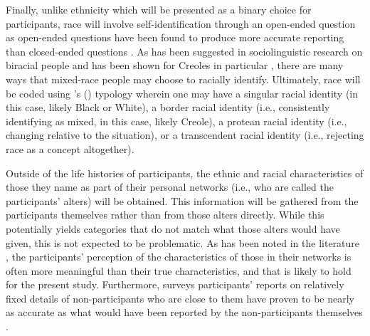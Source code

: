 \documentclass{article}\usepackage[]{graphicx}\usepackage[]{xcolor}
\begin{document}
      Finally, unlike ethnicity which will be presented as a binary choice for participants, race will involve self-identification through an open-ended question as open-ended questions have been found to produce more accurate reporting than closed-ended questions \parencite[p.~434]{vannette_proxy_2018}.
      As has been suggested in sociolinguistic research on biracial people \parencite{holliday_multiracial_2019} and has been shown for Creoles in particular \parencite{susberry_racial_2004}, there are many ways that mixed-race people may choose to racially identify.
      Ultimately, race will be coded using \citeauthor{rockquemore_beyond_2007}'s (\citeyear{rockquemore_beyond_2007}) typology wherein one may have a singular racial identity (in this case, likely Black or White), a border racial identity (i.e., consistently identifying as mixed, in this case, likely Creole), a protean racial identity (i.e., changing relative to the situation), or a transcendent racial identity (i.e., rejecting race as a concept altogether).

      Outside of the life histories of participants, the ethnic and racial characteristics of those they name as part of their personal networks (i.e., who are called the participants' alters) will be obtained.
      This information will be gathered from the participants themselves rather than from those alters directly.
      While this potentially yields categories that do not match what those alters would have given, this is not expected to be problematic.
      As has been noted in the literature \parencite[pp.~245-246]{vannette_collecting_2018}, the participants' perception of the characteristics of those in their networks is often more meaningful than their true characteristics, and that is likely to hold for the present study.
      Furthermore, surveys participants' reports on relatively fixed details of non-participants who are close to them have proven to be nearly as accurate as what would have been reported by the non-participants themselves \parencite{vannette_proxy_2018}.
\end{document}
